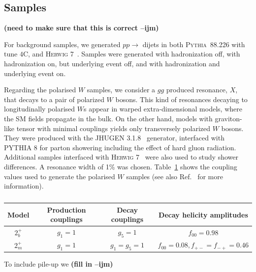\documentclass[11pt,letterpaper]{article}
\newcommand{\pythia}{\textsc{Pythia~8}\xspace}
\newcommand{\ijm}[1]{\textbf{\textcolor{llblue}{(#1 --ijm)}}}
\begin{document}
\subsection{Samples}\label{sec:samples_sub}

\ijm{need to make sure that this is correct}

For background samples, we generated $pp\to$ dijets in both \pythia{8.226} \cite{Sjostrand:2006za,Sjostrand:2007gs} with tune $4$C,   and \textsc{Herwig} 7~\cite{Bahr:2008pv,Bellm:2015jjp}. Samples were generated with hadronization off, with hadronization on, but underlying event off, and with hadronization and underlying event on.





Regarding the polarised $W$ samples, we consider a $gg$ produced resonance, $X$, that decays to a pair of polarized $W$ bosons. This kind of resonances decaying to longitudinally polarised $W$s appear in warped extra-dimensional models, where the SM fields propagate in the bulk. On the other hand, models with graviton-like tensor with minimal couplings yields only transversely polarized $W$ bosons. They were produced with the \textsc{JHUGEN} 3.1.8~\cite{Gao:2010qx,Bolognesi:2012mm} generator, interfaced with \textsc{PYTHIA} 8 \cite{Sjostrand:2007gs} for parton showering including the effect of hard gluon radiation. Additional samples interfaced with \textsc{Herwig} 7~\cite{Bahr:2008pv,Bellm:2015jjp} were also used to study shower differences. A resonance width of 1\% was chosen. Table~\ref{table:polarisedSamples} shows the coupling values used to generate the polarised $W$ samples (see also Ref.~\cite{Gao:2010qx} for more information). 

\begin{table}[ht]
\caption{}
\centering
\begin{tabular}{c c c c}
\hline\hline
Model	&Production couplings	&Decay couplings	&Decay helicity amplitudes 	\\
\hline
$2_b^+$	& $g_1=1$		& $g_5=1$		& $f_{00}=0.98$			\\
$2_m^+$	& $g_1=1$		& $g_1=g_5=1$		& $f_{00}=0.08,f_{+-}=f_{-+}=0.46$\\	
\hline
\end{tabular}
\label{table:polarisedSamples}
\end{table}

To include pile-up we \ijm{fill in}
\end{document}
